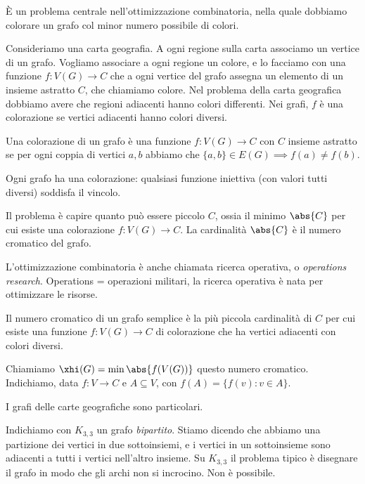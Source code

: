 	\`E un problema centrale nell'ottimizzazione combinatoria, nella quale dobbiamo colorare un grafo col minor numero possibile di colori.

	Consideriamo una carta geografia.
	A ogni regione sulla carta associamo un vertice di un grafo.
	Vogliamo associare a ogni regione un colore, e lo facciamo con una funzione $f: V(G) \to C$ che a ogni vertice del grafo assegna un elemento di un insieme astratto $C$, che chiamiamo colore.
	Nel problema della carta geografica dobbiamo avere che regioni adiacenti hanno colori differenti.
	Nei grafi, $f$ \`e una colorazione se vertici adiacenti hanno colori diversi.

	\begin{defn}
		Una colorazione di un grafo \`e una funzione $f : V(G) \to C$ con $C$ insieme astratto se per ogni coppia di vertici $a,b$ abbiamo che $\{a,b\} \in E(G) \implies f(a) \neq f(b)$.
	\end{defn}
	Ogni grafo ha una colorazione: qualsiasi funzione iniettiva (con valori tutti diversi) soddisfa il vincolo.

	Il problema \`e capire quanto pu\`o essere piccolo $C$, ossia il minimo $\abs{C}$ per cui esiste una colorazione $f : V(G) \to C$.
	La cardinalit\`a $\abs{C}$ \`e il numero cromatico del grafo.

	L'ottimizzazione combinatoria \`e anche chiamata ricerca operativa, o \emph{operations research}.
	Operations = operazioni militari, la ricerca operativa \`e nata per ottimizzare le risorse.

	\begin{defn}
		Il numero cromatico di un grafo semplice \`e la pi\`u piccola cardinalit\`a di $C$ per cui esiste una funzione $f : V(G) \to C$ di colorazione che ha vertici adiacenti con colori diversi.
	\end{defn}

	Chiamiamo $\xhi(G) = \min \abs{f(V(G))}$ questo numero cromatico.
	Indichiamo, data $f : V \to C$ e $A \subseteq V$, con $f(A) = \{ f(v) : v \in A \}$.

	I grafi delle carte geografiche sono particolari.

	Indichiamo con $K_{3,3}$ un grafo \emph{bipartito}.
	Stiamo dicendo che abbiamo una partizione dei vertici in due sottoinsiemi, e i vertici in un sottoinsieme sono adiacenti a tutti i vertici nell'altro insieme.
	Su $K_{3,3}$ il problema tipico \`e disegnare il grafo in modo che gli archi non si incrocino.
	Non \`e possibile.

